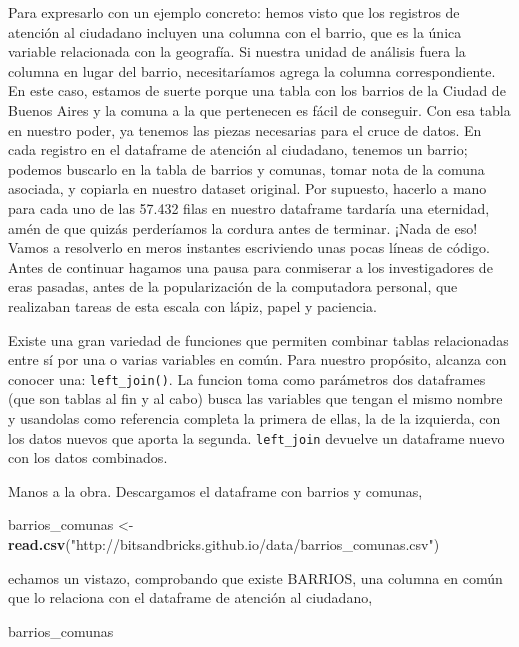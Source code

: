 \documentclass[]{book}
\newenvironment{Shaded}{\begin{snugshade}}{\end{snugshade}}
\newcommand{\KeywordTok}[1]{\textcolor[rgb]{0.13,0.29,0.53}{\textbf{#1}}}
\newcommand{\StringTok}[1]{\textcolor[rgb]{0.31,0.60,0.02}{#1}}
\newcommand{\NormalTok}[1]{#1}
\begin{document}
Para expresarlo con un ejemplo concreto: hemos visto que los registros
de atención al ciudadano incluyen una columna con el barrio, que es la
única variable relacionada con la geografía. Si nuestra unidad de
análisis fuera la columna en lugar del barrio, necesitaríamos agrega la
columna correspondiente. En este caso, estamos de suerte porque una
tabla con los barrios de la Ciudad de Buenos Aires y la comuna a la que
pertenecen es fácil de conseguir. Con esa tabla en nuestro poder, ya
tenemos las piezas necesarias para el cruce de datos. En cada registro
en el dataframe de atención al ciudadano, tenemos un barrio; podemos
buscarlo en la tabla de barrios y comunas, tomar nota de la comuna
asociada, y copiarla en nuestro dataset original. Por supuesto, hacerlo
a mano para cada uno de las 57.432 filas en nuestro dataframe tardaría
una eternidad, amén de que quizás perderíamos la cordura antes de
terminar. ¡Nada de eso! Vamos a resolverlo en meros instantes
escriviendo unas pocas líneas de código. Antes de continuar hagamos una
pausa para conmiserar a los investigadores de eras pasadas, antes de la
popularización de la computadora personal, que realizaban tareas de esta
escala con lápiz, papel y paciencia.

Existe una gran variedad de funciones que permiten combinar tablas
relacionadas entre sí por una o varias variables en común. Para nuestro
propósito, alcanza con conocer una: \texttt{left\_join()}. La funcion
toma como parámetros dos dataframes (que son tablas al fin y al cabo)
busca las variables que tengan el mismo nombre y usandolas como
referencia completa la primera de ellas, la de la izquierda, con los
datos nuevos que aporta la segunda. \texttt{left\_join} devuelve un
dataframe nuevo con los datos combinados.

Manos a la obra. Descargamos el dataframe con barrios y comunas,

\begin{Shaded}
\begin{Highlighting}[]
\NormalTok{barrios_comunas <-}\StringTok{ }\KeywordTok{read.csv}\NormalTok{(}\StringTok{"http://bitsandbricks.github.io/data/barrios_comunas.csv"}\NormalTok{)}
\end{Highlighting}
\end{Shaded}

echamos un vistazo, comprobando que existe BARRIOS, una columna en común
que lo relaciona con el dataframe de atención al ciudadano,

\begin{Shaded}
\begin{Highlighting}[]
\NormalTok{barrios_comunas}
\end{Highlighting}
\end{Shaded}
\end{document}

